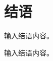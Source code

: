\newpage









\section*{\hei{}结\quad 语}

    \song{}
    输入结语内容。

    输入结语内容。


\setcounter{secnumdepth}{3}

